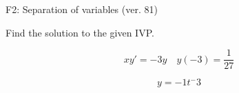 \begin{exercise}
  \begin{exerciseTitle}F2: Separation of variables (ver. 81)\end{exerciseTitle}
  \begin{exerciseStatement}
    
Find the solution to the given IVP.

    
\[xy'= -3 y \hspace{1em} y( -3 ) = \frac{1}{27}\]

  \end{exerciseStatement}
  \begin{exerciseAnswer}
    
\[y= -1 t^ -3\]

  \end{exerciseAnswer}
\end{exercise}